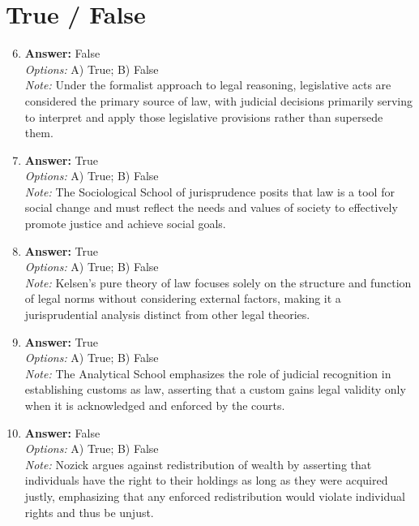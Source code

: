 \documentclass[12pt]{article}
\begin{document}
\section*{True / False}
\begin{enumerate}[label=\arabic*.]
\setcounter{enumi}{5}
\item \textbf{Answer:} False
\\ \textit{Options:} A) True; B) False
\\ \textit{Note:} Under the formalist approach to legal reasoning, legislative acts are considered the primary source of law, with judicial decisions primarily serving to interpret and apply those legislative provisions rather than supersede them.
\item \textbf{Answer:} True
\\ \textit{Options:} A) True; B) False
\\ \textit{Note:} The Sociological School of jurisprudence posits that law is a tool for social change and must reflect the needs and values of society to effectively promote justice and achieve social goals.
\item \textbf{Answer:} True
\\ \textit{Options:} A) True; B) False
\\ \textit{Note:} Kelsen's pure theory of law focuses solely on the structure and function of legal norms without considering external factors, making it a jurisprudential analysis distinct from other legal theories.
\item \textbf{Answer:} True
\\ \textit{Options:} A) True; B) False
\\ \textit{Note:} The Analytical School emphasizes the role of judicial recognition in establishing customs as law, asserting that a custom gains legal validity only when it is acknowledged and enforced by the courts.
\item \textbf{Answer:} False
\\ \textit{Options:} A) True; B) False
\\ \textit{Note:} Nozick argues against redistribution of wealth by asserting that individuals have the right to their holdings as long as they were acquired justly, emphasizing that any enforced redistribution would violate individual rights and thus be unjust.
\end{enumerate}
\end{document}
